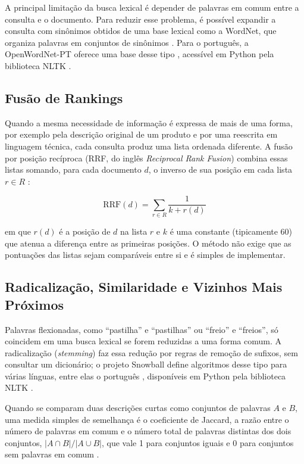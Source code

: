 A principal limitação da busca lexical é depender de palavras em comum entre a consulta e o documento. Para reduzir esse problema, é possível expandir a consulta com sinônimos obtidos de uma base lexical como a WordNet, que organiza palavras em conjuntos de sinônimos \cite{miller1995wordnet}. Para o português, a OpenWordNet-PT oferece uma base desse tipo \cite{paiva2012openwordnetpt}, acessível em Python pela biblioteca NLTK \cite{bird2009nltk}.

\subsection{Fusão de Rankings}

Quando a mesma necessidade de informação é expressa de mais de uma forma, por exemplo pela descrição original de um produto e por uma reescrita em linguagem técnica, cada consulta produz uma lista ordenada diferente. A fusão por posição recíproca (RRF, do inglês \textit{Reciprocal Rank Fusion}) combina essas listas somando, para cada documento $d$, o inverso de sua posição em cada lista $r \in R$ \cite{cormack2009rrf}:

\begin{equation}
\label{eq:rrf}
\mathrm{RRF}(d) = \sum_{r \in R} \frac{1}{k + r(d)}
\end{equation}

\noindent em que $r(d)$ é a posição de $d$ na lista $r$ e $k$ é uma constante (tipicamente 60) que atenua a diferença entre as primeiras posições. O método não exige que as pontuações das listas sejam comparáveis entre si e é simples de implementar.

\subsection{Radicalização, Similaridade e Vizinhos Mais Próximos}
\label{sec:knn}

Palavras flexionadas, como ``pastilha'' e ``pastilhas'' ou ``freio'' e ``freios'', só coincidem em uma busca lexical se forem reduzidas a uma forma comum. A radicalização (\textit{stemming}) faz essa redução por regras de remoção de sufixos, sem consultar um dicionário; o projeto Snowball define algoritmos desse tipo para várias línguas, entre elas o português \cite{porter2001snowball}, disponíveis em Python pela biblioteca NLTK \cite{bird2009nltk}.

Quando se comparam duas descrições curtas como conjuntos de palavras $A$ e $B$, uma medida simples de semelhança é o coeficiente de Jaccard, a razão entre o número de palavras em comum e o número total de palavras distintas dos dois conjuntos, $|A \cap B| / |A \cup B|$, que vale 1 para conjuntos iguais e 0 para conjuntos sem palavras em comum \cite{manning2008ir}.

